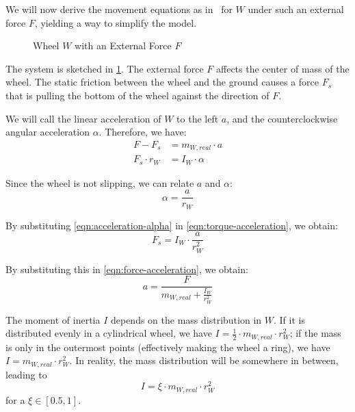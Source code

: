 \documentclass[copyright,submission]{eptcs}
\newcommand{\mi}[1]{\mathit{#1}}
\newcommand{\surface}{
    \begin{scope}[transparency group]
        \clip (-2,0) rectangle (2,-1);
        \draw[scope fading=south] (-2,0) rectangle (2,-1);
        \foreach \x in {-2,-1.75,...,3}
            \draw (\x,0) -- ($(\x,0) - (1,1)$);
    \end{scope}
}
\newcommand{\wheel}{
    \draw (0, 1) circle (1);
    \draw[fill] (0, 1) circle (0.05);
}
\begin{document}
We will now derive the movement equations as in~\cite{halliday2013fundamentals} for $W$ under such an external force $F$, yielding a way to simplify the model.

\begin{figure}[b]
    \centering{}
    \caption{\label{fig:wheel-with-force} Wheel $W$ with an External Force $F$}
\end{figure}

The system is sketched in \cref{fig:wheel-with-force}. The external force $F$ affects the center of mass of the wheel. The static friction between the wheel and the ground causes a force $F_s$ that is pulling the bottom of the wheel against the direction of $F$.

We will call the linear acceleration of $W$ to the left $a$, and the counterclockwise angular acceleration $\alpha$. Therefore, we have:
\begin{align}
    \label{eqn:force-acceleration} F - F_s &= m_{W, \mi{real}} \cdot a \\
    \label{eqn:torque-acceleration} F_s \cdot r_W &= I_W \cdot \alpha
\end{align}

Since the wheel is not slipping, we can relate $a$ and $\alpha$:
\begin{equation}\label{eqn:acceleration-alpha}
    \alpha = \frac{a}{r_W}
\end{equation}

By substituting \cref{eqn:acceleration-alpha} in \cref{eqn:torque-acceleration}, we obtain:
\begin{equation}
    F_s = I_W \cdot \frac{a}{r_W ^2}
\end{equation}

By substituting this in \cref{eqn:force-acceleration}, we obtain:
\begin{equation}\label{eqn:acceleration-inertia}
    a = \frac{F}{m_{W, \mi{real}} + \frac{I_W}{r_W ^2}}
\end{equation}

The moment of inertia $I$ depends on the mass distribution in $W$. If it is distributed evenly in a cylindrical wheel, we have $I = \frac{1}{2} \cdot m_{W, \mi{real}} \cdot r_W ^2$; if the mass is only in the outermost points (effectively making the wheel a ring), we have $I = m_{W, \mi{real}} \cdot r_W ^2$. In reality, the mass distribution will be somewhere in between, leading to
\begin{equation}\label{eqn:moment-of-inertia}
    I = \xi \cdot m_{W, \mi{real}} \cdot r_W ^2
\end{equation}
for a $\xi \in [0.5, 1]$.
\end{document}
